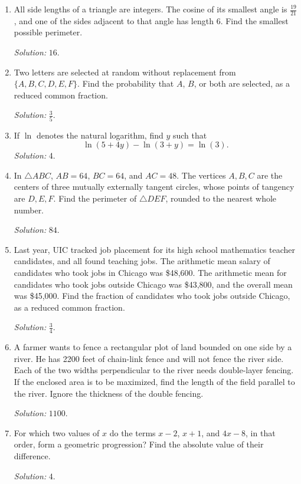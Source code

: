 \documentclass[11pt]{article}
\begin{document}
\begin{enumerate}[label=\textbf{\arabic*.}]
\item All side lengths of a triangle are integers. The cosine of its smallest angle is $\frac{19}{21}$, and one of the sides adjacent to that angle has length 6. Find the smallest possible perimeter.\par\textit{Solution: }$16$.

\item Two letters are selected at random without replacement from $\{A,B,C,D,E,F\}$. Find the probability that $A$, $B$, or both are selected, as a reduced common fraction.\par\textit{Solution: }$\frac35$.

\item If $\ln$ denotes the natural logarithm, find $y$ such that
\[
\ln(5+4y)-\ln(3+y)=\ln(3).
\]
\textit{Solution: }$4$.

\item In $\triangle ABC$, $AB=64$, $BC=64$, and $AC=48$. The vertices $A,B,C$ are the centers of three mutually externally tangent circles, whose points of tangency are $D,E,F$. Find the perimeter of $\triangle DEF$, rounded to the nearest whole number.\par\textit{Solution: }$84$.

\item Last year, UIC tracked job placement for its high school mathematics teacher candidates, and all found teaching jobs. The arithmetic mean salary of candidates who took jobs in Chicago was \$48{,}600. The arithmetic mean for candidates who took jobs outside Chicago was \$43{,}800, and the overall mean was \$45{,}000. Find the fraction of candidates who took jobs outside Chicago, as a reduced common fraction.\par\textit{Solution: }$\frac34$.

\item A farmer wants to fence a rectangular plot of land bounded on one side by a river. He has 2200 feet of chain-link fence and will not fence the river side. Each of the two widths perpendicular to the river needs double-layer fencing. If the enclosed area is to be maximized, find the length of the field parallel to the river. Ignore the thickness of the double fencing.\par\textit{Solution: }$1100$.

\item For which two values of $x$ do the terms $x-2$, $x+1$, and $4x-8$, in that order, form a geometric progression? Find the absolute value of their difference.\par\textit{Solution: }$4$.


\end{enumerate}
\end{document}
